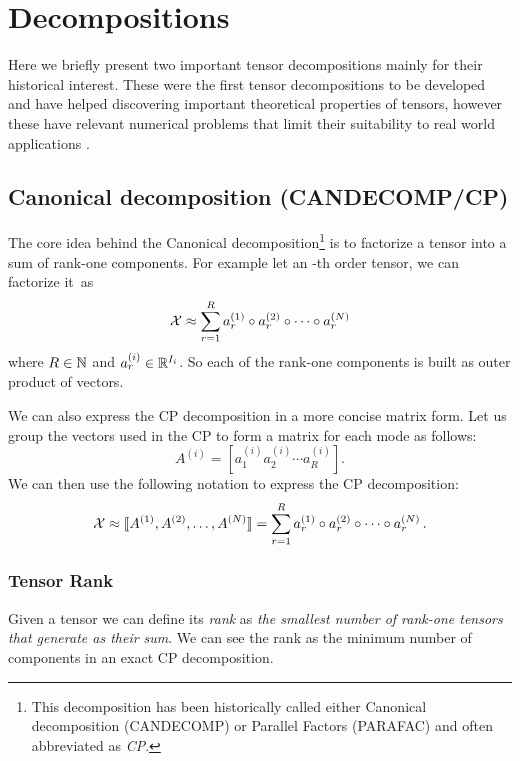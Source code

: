 \chapter{Decompositions}
Here we briefly present two important tensor decompositions mainly for their historical interest. These were the first tensor decompositions to be developed and have helped discovering important theoretical properties of tensors, however these have relevant numerical problems that limit their suitability to real world applications \cite{tensorreview}.

\section{Canonical decomposition (CANDECOMP/CP)}
The core idea behind the Canonical decomposition\footnote{This decomposition has been historically called either Canonical decomposition (CANDECOMP) or Parallel Factors (PARAFAC) and often abbreviated as \emph{CP}.} is to factorize a tensor into a sum of rank-one components. For example let \X an \N-th order tensor, we can factorize it~as
\begin{equation*}
  \mathcal{X} \approx \sum_{r = 1}^R a_r^{(1)} \circ a_r^{(2)} \circ \cdots \circ a_r^{(N)}
\end{equation*}
where $R \in \mathbb{N}$ and $a_r^{(i)} \in \mathbb{R}^{I_i}$. So each of the rank-one components is built as outer product of \N vectors.

We can also express the CP decomposition in a more concise matrix form.
Let us group the vectors used in the CP to form a matrix for each mode  as follows:
\begin{equation*}
  A^{(i)} = [ a^{(i)}_1 a^{(i)}_2 \cdots a^{(i)}_R ].
\end{equation*}
We can then use the following notation to express the CP decomposition:
\begin{equation*}
  \mathcal{X} \approx \llbracket A^{(1)}, A^{(2)}, \ldots, A^{(N)} \rrbracket = \sum_{r = 1}^R a_r^{(1)} \circ a_r^{(2)} \circ \cdots \circ a_r^{(N)}\, .
\end{equation*}

\subsection{Tensor Rank}
Given a tensor \X we can define its \emph{rank} as \emph{the smallest number of rank-one tensors that generate \X as their sum}. We can see the rank as the minimum number of components in an exact CP decomposition.

